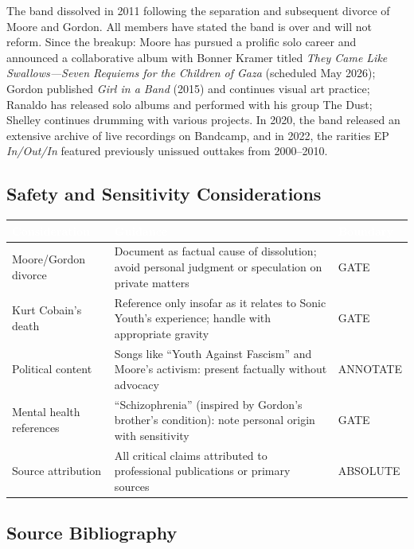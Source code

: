 \documentclass[11pt,letterpaper]{article}
\newcommand{\tableheader}[1]{\textbf{\sffamily\textcolor{white}{#1}}}
\begin{document}
The band dissolved in 2011 following the separation and subsequent divorce of Moore and Gordon. All members have stated the band is over and will not reform. Since the breakup: Moore has pursued a prolific solo career and announced a collaborative album with Bonner Kramer titled \textit{They Came Like Swallows---Seven Requiems for the Children of Gaza} (scheduled May 2026); Gordon published \textit{Girl in a Band} (2015) and continues visual art practice; Ranaldo has released solo albums and performed with his group The Dust; Shelley continues drumming with various projects. In 2020, the band released an extensive archive of live recordings on Bandcamp, and in 2022, the rarities EP \textit{In/Out/In} featured previously unissued outtakes from 2000--2010.

\subsection{Safety and Sensitivity Considerations}

\begin{center}
\begin{tabularx}{\textwidth}{L{4cm}XC{2cm}}
\toprule
{}
\tableheader{Consideration} & \tableheader{Guidance} & \tableheader{Boundary} \\
\midrule
Moore/Gordon divorce & Document as factual cause of dissolution; avoid personal judgment or speculation on private matters & GATE \\
Kurt Cobain's death & Reference only insofar as it relates to Sonic Youth's experience; handle with appropriate gravity & GATE \\
Political content & Songs like ``Youth Against Fascism'' and Moore's activism: present factually without advocacy & ANNOTATE \\
Mental health references & ``Schizophrenia'' (inspired by Gordon's brother's condition): note personal origin with sensitivity & GATE \\
Source attribution & All critical claims attributed to professional publications or primary sources & ABSOLUTE \\
\bottomrule
\end{tabularx}
\end{center}

\subsection{Source Bibliography}
\end{document}
